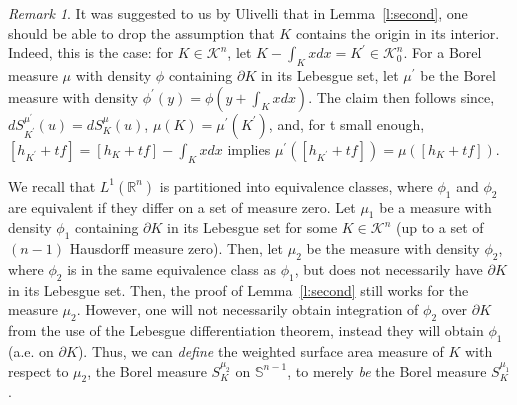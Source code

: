 \documentclass[11pt]{amsart}
\theoremstyle{definition}
\theoremstyle{remark}
\newtheorem{remark}[theorem]{Remark}
\numberwithin{equation}{section}
\newcommand{\R}{\mathbb{R}}
\newcommand{\s}{\mathbb{S}}
\newcommand{\conbod}{\mathcal{K}^n}
\begin{document}
  \begin{remark}
  \label{r:second}
     It was suggested to us by Ulivelli that in Lemma~\ref{l:second}, one should be able to drop the assumption that $K$ contains the origin in its interior. Indeed, this is the case:
     for $K\in\conbod$, let $K-\int_{K}xdx = K^\prime \in \conbod_0.$ For a Borel measure $\mu$ with density $\phi$ containing $\partial K$ in its Lebesgue set, let $\mu^\prime$ be the Borel measure with density $\phi^\prime(y) = \phi(y+\int_K x dx)$. The claim then follows since, $dS^{\mu^\prime}_{K^\prime}(u)=dS^\mu_K(u)$, $\mu(K)=\mu^\prime(K^\prime)$, and, for t small enough, $[h_{K^\prime}+tf]=[h_K+tf]-\int_K x dx$ implies $\mu^\prime([h_{K^\prime}+tf])=\mu([h_K+tf]).$
 \end{remark}

 \noindent We recall that $L^1(\R^n)$ is partitioned into equivalence classes, where $\phi_1$ and $\phi_2$ are equivalent if they differ on a set of measure zero. Let $\mu_1$ be a measure with density $\phi_1$ containing $\partial K$ in its Lebesgue set for some $K\in\conbod$ (up to a set of $(n-1)$ Hausdorff measure zero). Then, let $\mu_2$ be the measure with density $\phi_2$, where $\phi_2$ is in the same equivalence class as $\phi_1$, but does not necessarily have $\partial K$ in its Lebesgue set. Then, the proof of Lemma~\ref{l:second} still works for the measure $\mu_2$. However, one will not necessarily obtain integration of $\phi_2$ over $\partial K$ from the use of the Lebesgue differentiation theorem, instead they will obtain $\phi_1$ (a.e. on $\partial K$). Thus, we can \textit{define} the weighted surface area measure of $K$ with respect to $\mu_2$, the Borel measure $S^{\mu_2}_K$ on $\s^{n-1}$, to merely \textit{be} the Borel measure $S^{\mu_1}_K$.
	
\end{document}
